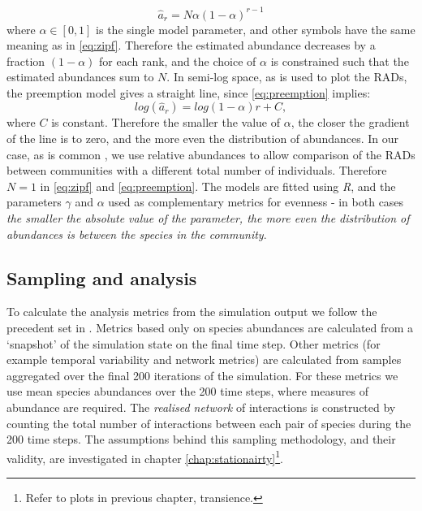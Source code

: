 \begin{equation}
\hat{a}_r = N\alpha(1-\alpha)^{r-1}
\label{eq:preemption}
\end{equation}
%  
where $\alpha \in [0,1]$ is the single model parameter, and other symbols have the same meaning as in \eqref{eq:zipf}. Therefore the estimated abundance decreases by a fraction $(1-\alpha)$ for each rank, and the choice of $\alpha$ is constrained such that the estimated abundances sum to $N$. In semi-log space, as is used to plot the RADs, the preemption model gives a straight line, since \eqref{eq:preemption} implies:
\begin{equation}
log\left(\hat{a}_r\right) = log\left(1-\alpha\right)r + C,
\label{eq:preemption}
\end{equation}
%  
where $C$ is constant. Therefore the smaller the value of $\alpha$, the closer the gradient of the line is to zero, and the more even the distribution of abundances. In our case, as is common \cite{oksanen2007vegan}, we use relative abundances to allow comparison of the RADs between communities with a different total number of individuals. Therefore $N=1$ in \eqref{eq:zipf} and \eqref{eq:preemption}. The models are fitted using \emph{R}, and the parameters $\gamma$ and $\alpha$ used as complementary metrics for evenness - in both cases \emph{the smaller the absolute value of the parameter, the more even the distribution of abundances is between the species in the community}.   

\subsection{Sampling and analysis}
\label{sec:sampling}

To calculate the analysis metrics from the simulation output we follow the precedent set in \cite{lurgi2015effects}. Metrics based only on species abundances are calculated from a `snapshot' of the simulation state on the final time step. Other metrics (for example temporal variability and network metrics) are calculated from samples aggregated over the final 200 iterations of the simulation. For these metrics we use mean species abundances over the 200 time steps, where measures of abundance are required. The \emph{realised network} of interactions is constructed by counting the total number of interactions between each pair of species during the 200 time steps. The assumptions behind this sampling methodology, and their validity, are investigated in chapter \ref{chap:stationairty}\footnote{Refer to plots in previous chapter, transience.}.

